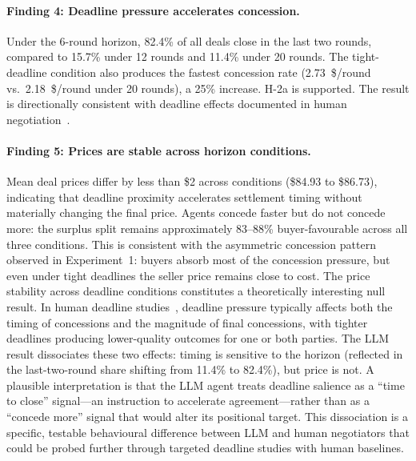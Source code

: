 \paragraph{Finding 4: Deadline pressure accelerates concession.}
Under the 6-round horizon, 82.4\% of all deals close in the last two rounds, compared to 15.7\% under 12 rounds and 11.4\% under 20 rounds.  The tight-deadline condition also produces the fastest concession rate (2.73~\$/round vs.\ 2.18~\$/round under 20 rounds), a 25\% increase.  H-2a is supported.  The result is directionally consistent with deadline effects documented in human negotiation~\cite{roth1988deadline}.

\paragraph{Finding 5: Prices are stable across horizon conditions.}
Mean deal prices differ by less than \$2 across conditions (\$84.93 to \$86.73), indicating that deadline proximity accelerates settlement timing without materially changing the final price.  Agents concede faster but do not concede more: the surplus split remains approximately 83--88\% buyer-favourable across all three conditions.  This is consistent with the asymmetric concession pattern observed in Experiment~1: buyers absorb most of the concession pressure, but even under tight deadlines the seller price remains close to cost.  The price stability across deadline conditions constitutes a theoretically interesting null result.  In human deadline studies~\cite{roth1988deadline}, deadline pressure typically affects both the timing of concessions and the magnitude of final concessions, with tighter deadlines producing lower-quality outcomes for one or both parties.  The LLM result dissociates these two effects: timing is sensitive to the horizon (reflected in the last-two-round share shifting from 11.4\% to 82.4\%), but price is not.  A plausible interpretation is that the LLM agent treats deadline salience as a ``time to close'' signal---an instruction to accelerate agreement---rather than as a ``concede more'' signal that would alter its positional target.  This dissociation is a specific, testable behavioural difference between LLM and human negotiators that could be probed further through targeted deadline studies with human baselines.


